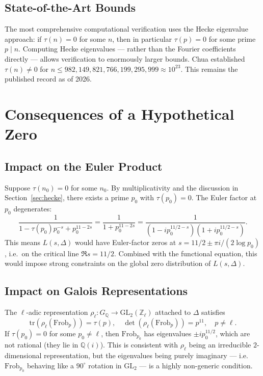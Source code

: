 \documentclass[12pt,a4paper]{amsart}
\theoremstyle{definition}
\begin{document}
\subsection{State-of-the-Art Bounds}

The most comprehensive computational verification uses the Hecke eigenvalue
approach: if $\tau(n) = 0$ for some $n$, then in particular $\tau(p) = 0$ for some
prime $p \mid n$. Computing Hecke eigenvalues --- rather than the Fourier
coefficients directly --- allows verification to enormously larger bounds. Chua
\cite{Chua2004} established $\tau(n) \neq 0$ for $n \leq 982{,}149{,}821{,}766{,}199{,}295{,}999 \approx 10^{23}$.
This remains the published record as of 2026.

\section{Consequences of a Hypothetical Zero}

\subsection{Impact on the Euler Product}

Suppose $\tau(n_0) = 0$ for some $n_0$. By multiplicativity and the discussion in
Section~\ref{sec:hecke}, there exists a prime $p_0$ with $\tau(p_0) = 0$.
The Euler factor at $p_0$ degenerates:
\[
  \frac{1}{1 - \tau(p_0)p_0^{-s} + p_0^{11-2s}}
  = \frac{1}{1 + p_0^{11-2s}}
  = \frac{1}{(1 - ip_0^{11/2-s})(1 + ip_0^{11/2-s})}.
\]
This means $L(s, \Delta)$ would have Euler-factor zeros at $s = 11/2 \pm \pi i /
(2 \log p_0)$, i.e.\ on the critical line $\Re s = 11/2$. Combined with the
functional equation, this would impose strong constraints on the global zero
distribution of $L(s, \Delta)$.

\subsection{Impact on Galois Representations}

The $\ell$-adic representation $\rho_\ell : G_\mathbb{Q} \to \mathrm{GL}_2(\mathbb{Z}_\ell)$
attached to $\Delta$ satisfies
\[
  \mathrm{tr}(\rho_\ell(\mathrm{Frob}_p)) = \tau(p), \quad
  \det(\rho_\ell(\mathrm{Frob}_p)) = p^{11},
  \quad p \neq \ell.
\]
If $\tau(p_0) = 0$ for some $p_0 \neq \ell$, then $\mathrm{Frob}_{p_0}$ has
eigenvalues $\pm i p_0^{11/2}$, which are not rational (they lie in
$\mathbb{Q}(i)$). This is consistent with $\rho_\ell$ being an irreducible
$2$-dimensional representation, but the eigenvalues being purely imaginary ---
i.e.\ $\mathrm{Frob}_{p_0}$ behaving like a $90^\circ$ rotation in
$\mathrm{GL}_2$ --- is a highly non-generic condition.
\end{document}
